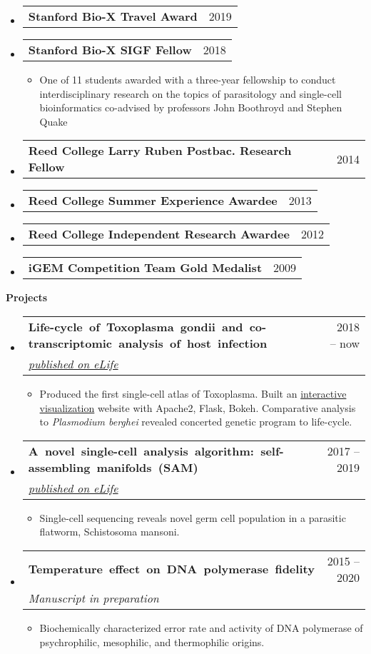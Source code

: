 \documentclass[letterpaper,12pt]{article}[leftmargin=*]
\makeatletter
\def \entryspacing {-0pt}
\renewcommand{\section}[2]{\vspace{5pt}
  \colorbox{secondary}{\color{white}\raggedbottom\normalsize\textbf{{#1}{\hspace{7pt}#2}}}
}
\newcommand{\resumeEntryStart}{\begin{itemize}[leftmargin=2.5mm]}
\newcommand{\resumeEntryEnd}{\end{itemize}\vspace{\entryspacing}}
\newcommand{\resumeItemListStart}{\begin{itemize}[leftmargin=4.5mm]}
\newcommand{\resumeItemListEnd}{\end{itemize}}
\newcommand{\resumeItem}[1]{
  \item\small{
    {#1 \vspace{-2pt}}
  }
}
\newcommand{\resumeEntryTSDL}[4]{
  \vspace{-1pt}\item[]
    \begin{tabularx}{0.97\textwidth}{X@{\hspace{40pt}}r}
      \mbox{\textbf{\color{primary}#1}} & {\firabook\color{accent}\small#2} \\
      \textit{\color{accent}\small#3} & \textit{\color{accent}\small#4} \\
    \end{tabularx}\vspace{-8pt}
}
\newcommand{\resumeEntryTD}[2]{
  \vspace{-1pt}\item[]
    \begin{tabularx}{0.97\textwidth}{X@{\hspace{40pt}}r}
      \textbf{\color{primary}#1} & {\firabook\color{accent}\small#2} \\
    \end{tabularx}\vspace{-6pt}
}
\makeatother
\begin{document}
  \resumeEntryStart
    \resumeEntryTD
      {Stanford Bio-X Travel Award}{2019}
    \resumeEntryTD
      {Stanford Bio-X SIGF Fellow}{2018}
    \resumeItemListStart
      \resumeItem {One of 11 students awarded with a three-year fellowship to conduct interdisciplinary research on the topics of parasitology and single-cell bioinformatics co-advised by professors John Boothroyd and Stephen Quake}
    \resumeItemListEnd
    \resumeEntryTD
      {Reed College Larry Ruben Postbac. Research Fellow}{2014}
    \resumeEntryTD
      {Reed College Summer Experience Awardee}{2013}
    \resumeEntryTD
      {Reed College Independent Research Awardee}{2012}
    \resumeEntryTD
      {iGEM Competition Team Gold Medalist}{2009}
  \resumeEntryEnd

\section{\faFlask}{Projects}

  \resumeEntryStart
    \resumeEntryTSDL
      {Life-cycle of Toxoplasma gondii and co-transcriptomic analysis of host infection}{2018 -- now}
      {\href{https://elifesciences.org/articles/54129}{published on eLife}}{}
    \resumeItemListStart
      \resumeItem {Produced the first single-cell atlas of Toxoplasma. Built an \href{http://st-atlas.org}{interactive visualization} website with Apache2, Flask, Bokeh. Comparative analysis to \textit{Plasmodium berghei} revealed concerted genetic program to life-cycle.}
    \resumeItemListEnd
  \resumeEntryEnd

  \resumeEntryStart
    \resumeEntryTSDL
      {A novel single-cell analysis algorithm: self-assembling manifolds (SAM)}{2017 -- 2019}
      {\href{https://elifesciences.org/articles/48994}{published on eLife}}{}
    \resumeItemListStart
      \resumeItem {Single-cell sequencing reveals novel germ cell population in a parasitic flatworm, Schistosoma mansoni.}
    \resumeItemListEnd
  \resumeEntryEnd

  \resumeEntryStart
    \resumeEntryTSDL
      {Temperature effect on DNA polymerase fidelity}{2015 -- 2020}
      {Manuscript in preparation}{}
    \resumeItemListStart
      \resumeItem {Biochemically characterized error rate and activity of DNA polymerase of psychrophilic, mesophilic, and thermophilic origins.}
    \resumeItemListEnd
  \resumeEntryEnd


\newpage
\end{document}
